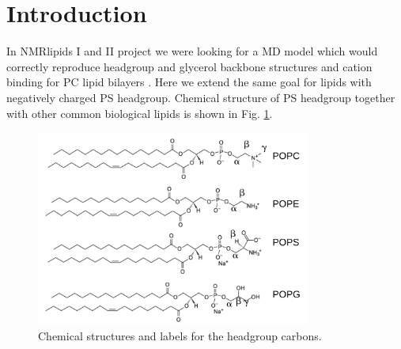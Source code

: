 \documentclass[aps,prl,superscriptaddress,twocolumn]{revtex4}
\begin{document}
\section{Introduction}

In NMRlipids I and II project we were looking for a MD model
which would correctly reproduce headgroup and glycerol
backbone structures and cation binding for PC lipid bilayers \cite{botan15,catte16}.
Here we extend the same goal for lipids with negatively charged PS headgroup.
Chemical structure of PS headgroup together with other common biological
lipids is shown in Fig. \ref{lipids}.
\begin{figure}[]
  \centering
  \includegraphics[width=9.0cm]{../Figs/lipids.pdf}
  \caption{\label{lipids}
    Chemical structures and labels for the headgroup carbons.
  }
\end{figure}
\end{document}
